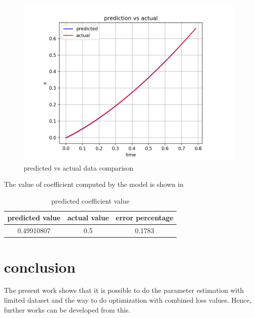 \documentclass{article}
\begin{document}
\begin{figure}[!h]
	\centering
	\includegraphics[scale = 0.5]{supportingFiles/output.png}
	\caption{predicted vs actual data comparison}
	\label{predvsactFig}
\end{figure}

The value of coefficient computed by the model is shown in  \\

\begin{table}
	\center
	\caption{predicted coefficient value}
	\begin{tabular}{|c|c|c|}
		\hline
		predicted value & actual value & error percentage \\ \hline \hline
		0.49910807 & 0.5 & 0.1783 \\ \hline
	\end{tabular}
	\label{coeff_table}
\end{table}

\section{conclusion}
The present work shows that it is possible to do the parameter estimation
with limited dataset and the way to do optimization
with combined loss values. Hence, further works can be developed from this.

\center{*****}
\end{document}
